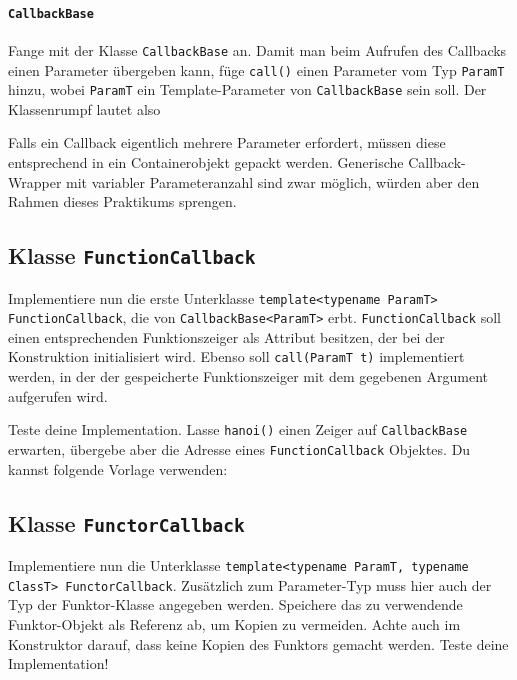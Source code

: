 \paragraph*{\lstinline{CallbackBase}}

Fange mit der Klasse \lstinline{CallbackBase} an.
Damit man beim Aufrufen des Callbacks einen Parameter übergeben kann, füge \lstinline{call()} einen Parameter vom Typ \lstinline{ParamT} hinzu, wobei \lstinline{ParamT} ein Template-Parameter von \lstinline{CallbackBase} sein soll.
Der Klassenrumpf lautet also


Falls ein Callback eigentlich mehrere Parameter erfordert, müssen diese entsprechend in ein Containerobjekt gepackt werden.
Generische Callback-Wrapper mit variabler Parameteranzahl sind zwar möglich, würden aber den Rahmen dieses Praktikums sprengen.


\subsection{Klasse \lstinline{FunctionCallback}}
Implementiere nun die erste Unterklasse \lstinline{template<typename ParamT> FunctionCallback}, die von \lstinline{CallbackBase<ParamT>} erbt.
\lstinline{FunctionCallback} soll einen entsprechenden Funktionszeiger als Attribut besitzen, der bei der Konstruktion initialisiert wird.
Ebenso soll \lstinline{call(ParamT t)} implementiert werden, in der der gespeicherte Funktionszeiger mit dem gegebenen Argument aufgerufen wird.

Teste deine Implementation.
Lasse \lstinline{hanoi()} einen Zeiger auf \lstinline{CallbackBase} erwarten, übergebe aber die Adresse eines \lstinline{FunctionCallback} Objektes.
Du kannst folgende Vorlage verwenden:



\subsection{Klasse \lstinline{FunctorCallback}}
Implementiere nun die Unterklasse \lstinline{template<typename ParamT, typename ClassT> FunctorCallback}.
Zusätzlich zum Parameter-Typ muss hier auch der Typ der Funktor-Klasse angegeben werden.
Speichere das zu verwendende Funktor-Objekt als Referenz ab, um Kopien zu vermeiden.
Achte auch im Konstruktor darauf, dass keine Kopien des Funktors gemacht werden.
Teste deine Implementation!




